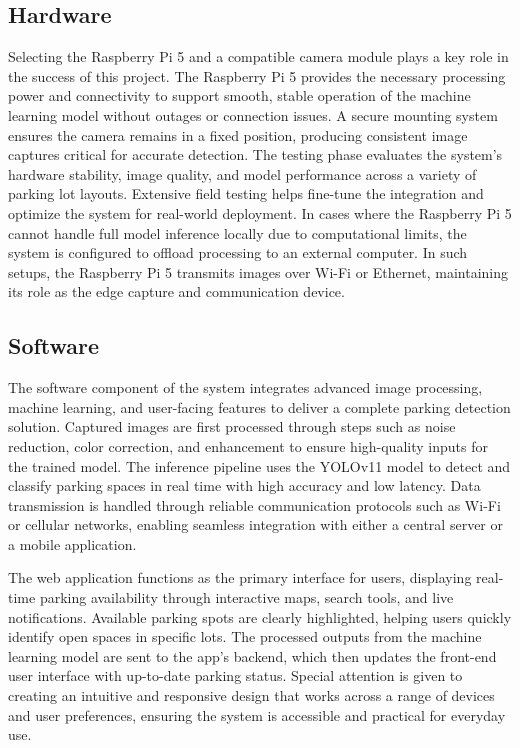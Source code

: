 \documentclass[conference]{IEEEtran}
\begin{document}
\subsection{Hardware}

Selecting the Raspberry Pi 5 and a compatible camera module plays a key role in the success of this project. The Raspberry Pi 5 provides the necessary processing power and connectivity to support smooth, stable operation of the machine learning model without outages or connection issues. A secure mounting system ensures the camera remains in a fixed position, producing consistent image captures critical for accurate detection. The testing phase evaluates the system’s hardware stability, image quality, and model performance across a variety of parking lot layouts. Extensive field testing helps fine-tune the integration and optimize the system for real-world deployment. In cases where the Raspberry Pi 5 cannot handle full model inference locally due to computational limits, the system is configured to offload processing to an external computer. In such setups, the Raspberry Pi 5 transmits images over Wi-Fi or Ethernet, maintaining its role as the edge capture and communication device.

\subsection{Software}
The software component of the system integrates advanced image processing, machine learning, and user-facing features to deliver a complete parking detection solution. Captured images are first processed through steps such as noise reduction, color correction, and enhancement to ensure high-quality inputs for the trained model. The inference pipeline uses the YOLOv11 model to detect and classify parking spaces in real time with high accuracy and low latency. Data transmission is handled through reliable communication protocols such as Wi-Fi or cellular networks, enabling seamless integration with either a central server or a mobile application.

The web application functions as the primary interface for users, displaying real-time parking availability through interactive maps, search tools, and live notifications. Available parking spots are clearly highlighted, helping users quickly identify open spaces in specific lots. The processed outputs from the machine learning model are sent to the app’s backend, which then updates the front-end user interface with up-to-date parking status. Special attention is given to creating an intuitive and responsive design that works across a range of devices and user preferences, ensuring the system is accessible and practical for everyday use.
\end{document}
